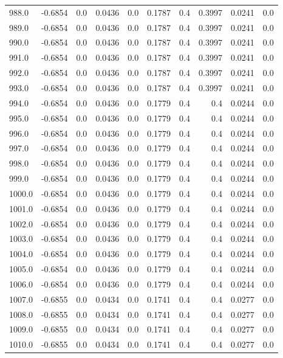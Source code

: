 \begin{longtable}{lrrrrrrrrr}
988.0 & -0.6854 & 0.0 & 0.0436 & 0.0 & 0.1787 & 0.4 & 0.3997 & 0.0241 & 0.0 \\
989.0 & -0.6854 & 0.0 & 0.0436 & 0.0 & 0.1787 & 0.4 & 0.3997 & 0.0241 & 0.0 \\
990.0 & -0.6854 & 0.0 & 0.0436 & 0.0 & 0.1787 & 0.4 & 0.3997 & 0.0241 & 0.0 \\
991.0 & -0.6854 & 0.0 & 0.0436 & 0.0 & 0.1787 & 0.4 & 0.3997 & 0.0241 & 0.0 \\
992.0 & -0.6854 & 0.0 & 0.0436 & 0.0 & 0.1787 & 0.4 & 0.3997 & 0.0241 & 0.0 \\
993.0 & -0.6854 & 0.0 & 0.0436 & 0.0 & 0.1787 & 0.4 & 0.3997 & 0.0241 & 0.0 \\
994.0 & -0.6854 & 0.0 & 0.0436 & 0.0 & 0.1779 & 0.4 & 0.4 & 0.0244 & 0.0 \\
995.0 & -0.6854 & 0.0 & 0.0436 & 0.0 & 0.1779 & 0.4 & 0.4 & 0.0244 & 0.0 \\
996.0 & -0.6854 & 0.0 & 0.0436 & 0.0 & 0.1779 & 0.4 & 0.4 & 0.0244 & 0.0 \\
997.0 & -0.6854 & 0.0 & 0.0436 & 0.0 & 0.1779 & 0.4 & 0.4 & 0.0244 & 0.0 \\
998.0 & -0.6854 & 0.0 & 0.0436 & 0.0 & 0.1779 & 0.4 & 0.4 & 0.0244 & 0.0 \\
999.0 & -0.6854 & 0.0 & 0.0436 & 0.0 & 0.1779 & 0.4 & 0.4 & 0.0244 & 0.0 \\
1000.0 & -0.6854 & 0.0 & 0.0436 & 0.0 & 0.1779 & 0.4 & 0.4 & 0.0244 & 0.0 \\
1001.0 & -0.6854 & 0.0 & 0.0436 & 0.0 & 0.1779 & 0.4 & 0.4 & 0.0244 & 0.0 \\
1002.0 & -0.6854 & 0.0 & 0.0436 & 0.0 & 0.1779 & 0.4 & 0.4 & 0.0244 & 0.0 \\
1003.0 & -0.6854 & 0.0 & 0.0436 & 0.0 & 0.1779 & 0.4 & 0.4 & 0.0244 & 0.0 \\
1004.0 & -0.6854 & 0.0 & 0.0436 & 0.0 & 0.1779 & 0.4 & 0.4 & 0.0244 & 0.0 \\
1005.0 & -0.6854 & 0.0 & 0.0436 & 0.0 & 0.1779 & 0.4 & 0.4 & 0.0244 & 0.0 \\
1006.0 & -0.6854 & 0.0 & 0.0436 & 0.0 & 0.1779 & 0.4 & 0.4 & 0.0244 & 0.0 \\
1007.0 & -0.6855 & 0.0 & 0.0434 & 0.0 & 0.1741 & 0.4 & 0.4 & 0.0277 & 0.0 \\
1008.0 & -0.6855 & 0.0 & 0.0434 & 0.0 & 0.1741 & 0.4 & 0.4 & 0.0277 & 0.0 \\
1009.0 & -0.6855 & 0.0 & 0.0434 & 0.0 & 0.1741 & 0.4 & 0.4 & 0.0277 & 0.0 \\
1010.0 & -0.6855 & 0.0 & 0.0434 & 0.0 & 0.1741 & 0.4 & 0.4 & 0.0277 & 0.0 \\

\end{longtable}
